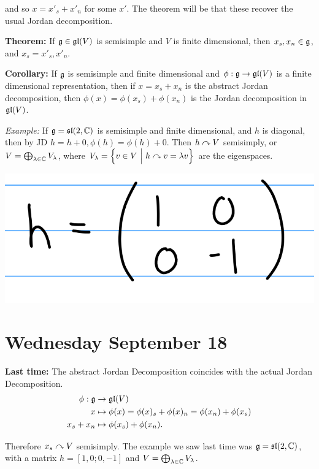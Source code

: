 and so \(x = x'_s + x'_n\) for some \(x'\). The theorem will be that
these recover the usual Jordan decomposition.

\textbf{Theorem:} If \({\mathfrak{g}} \in {\mathfrak{gl}}(V)\) is semisimple and \(V\) is
finite dimensional, then \(x_s, x_n \in {\mathfrak{g}}\), and
\(x_s = x'_s, x'_n\).

\textbf{Corollary:} If \({\mathfrak{g}}\) is semisimple and finite dimensional
and \(\phi: {\mathfrak{g}} \to {\mathfrak{gl}}(V)\) is a finite dimensional
representation, then if \(x = x_s + x_n\) is the abstract Jordan
decomposition, then \(\phi(x) = \phi(x_s) + \phi(x_n)\) is the Jordan
decomposition in \({\mathfrak{gl}}(V)\).

\emph{Example:} If \({\mathfrak{g}} = {\mathfrak{sl}}(2, {\mathbb{C}})\) is semisimple and finite
dimensional, and \(h\) is diagonal, then by JD
\(h = h + 0, \phi(h) = \phi(h) + 0\). Then \(h \curvearrowright V\) semisimply,
or \(V = \bigoplus_{\lambda \in {\mathbb{C}}} V_\lambda\), where
\(V_\lambda = \left\{{v\in V {~\mathrel{\Big|}~} h\curvearrowright v = \lambda v}\right\}\) are the
eigenspaces.

\includegraphics{figures/2019-09-16-10:05.png}\\

\hypertarget{wednesday-september-18}{%
\section{Wednesday September 18}\label{wednesday-september-18}}

\textbf{Last time:} The abstract Jordan Decomposition coincides with the
actual Jordan Decomposition. \begin{align*}
\phi: {\mathfrak{g}} &\to {\mathfrak{gl}}(V) \\ 
x &\mapsto \phi(x) = \phi(x)_s + \phi(x)_n = \phi(x_n) + \phi(x_s) \\
x_s + x_n &\mapsto \phi(x_s) + \phi(x_n)
.\end{align*}

Therefore \(x_s \curvearrowright V\) semisimply. The example we saw last time was
\({\mathfrak{g}} = {\mathfrak{sl}}(2, {\mathbb{C}})\), with a matrix \(h = [1, 0; 0, -1]\) and
\(V = \bigoplus_{\lambda \in {\mathbb{C}}} V_ \lambda\).

